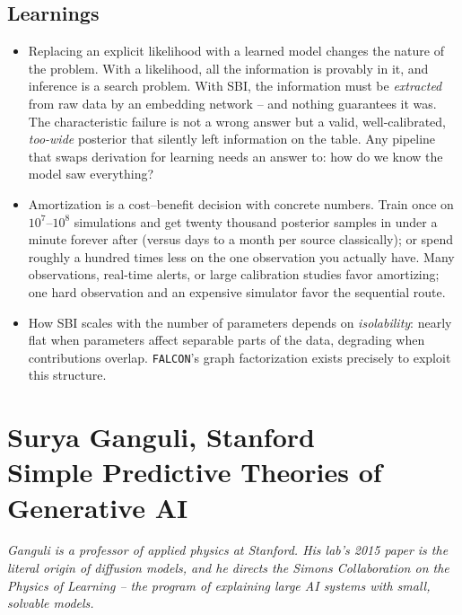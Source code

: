 \documentclass[11pt]{article}
\begin{document}
\subsection*{Learnings}
\begin{itemize}
    \item Replacing an explicit likelihood with a learned model changes the nature of the problem. With a likelihood, all the information is provably in it, and inference is a search problem. With SBI, the information must be \emph{extracted} from raw data by an embedding network -- and nothing guarantees it was. The characteristic failure is not a wrong answer but a valid, well-calibrated, \emph{too-wide} posterior that silently left information on the table. Any pipeline that swaps derivation for learning needs an answer to: how do we know the model saw everything?
    \item Amortization is a cost--benefit decision with concrete numbers. Train once on $10^{7}$--$10^{8}$ simulations and get twenty thousand posterior samples in under a minute forever after (versus days to a month per source classically); or spend roughly a hundred times less on the one observation you actually have. Many observations, real-time alerts, or large calibration studies favor amortizing; one hard observation and an expensive simulator favor the sequential route.
    \item How SBI scales with the number of parameters depends on \emph{isolability}: nearly flat when parameters affect separable parts of the data, degrading when contributions overlap. \texttt{FALCON}'s graph factorization exists precisely to exploit this structure.
\end{itemize}

\section{Surya Ganguli, Stanford\\
{\large Simple Predictive Theories of Generative AI}}

\emph{Ganguli is a professor of applied physics at Stanford. His lab's 2015 paper is the literal origin of diffusion models, and he directs the Simons Collaboration on the Physics of Learning -- the program of explaining large AI systems with small, solvable models.}
\end{document}

